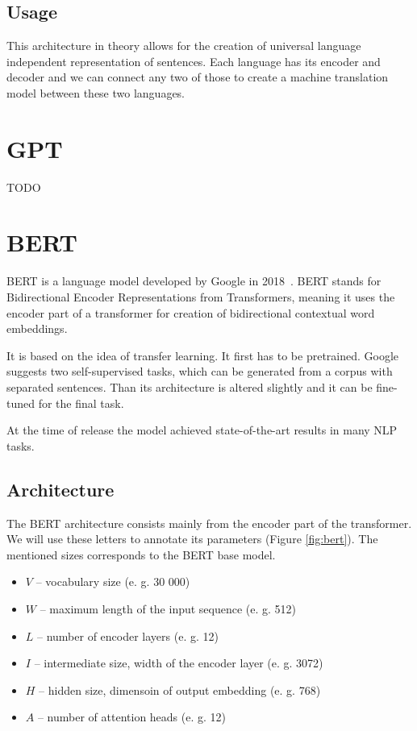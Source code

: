 \documentclass[
  digital, %
  table,   %
  twoside, %
  lof,     %
  lot,     %
]{fithesis3}
\begin{document}
\subsection{Usage}
This architecture in theory allows for the creation of universal language independent representation of sentences. Each language has its encoder and decoder and we can connect any two of those to create a machine translation model between these two languages. 


\section{GPT}
TODO

\section{BERT}
BERT is a language model developed by Google in 2018~\parencite{bert}. BERT stands for Bidirectional Encoder Representations from Transformers, meaning it uses the encoder part of a transformer for creation of bidirectional contextual word embeddings. 

It is based on the idea of transfer learning. It first has to be pretrained. Google suggests two self-supervised tasks, which can be generated from a corpus with separated sentences. Than its architecture is altered slightly and it can be fine-tuned for the final task.  

At the time of release the model achieved state-of-the-art results in many NLP tasks. 

\subsection{Architecture}
The BERT architecture consists mainly from the encoder part of the transformer. We will use these letters to annotate its parameters (Figure \ref{fig:bert}). The mentioned sizes corresponds to the BERT base model.
\begin{itemize}
\itemsep0em 
\item $V$ -- vocabulary size (e. g. 30 000)
\item $W$ -- maximum length of the input sequence (e. g. 512)
\item $L$ -- number of encoder layers (e. g. 12)
\item $I$ -- intermediate size, width of the encoder layer (e. g. 3072)
\item $H$ -- hidden size, dimensoin of output embedding (e. g. 768)
\item $A$ -- number of attention heads (e. g. 12)
\end{itemize}
\end{document}
